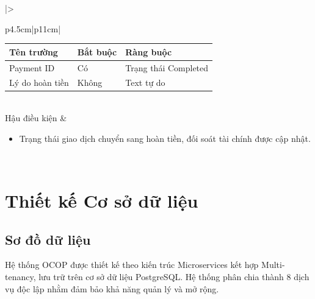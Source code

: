 \documentclass[12pt,a4paper]{report}
\begin{document}
\begin{longtable}{|>{\raggedright\arraybackslash\bfseries}p{4.5cm}|p{11cm}|}
\begin{tabular}{|p{3.5cm}|p{2.5cm}|p{4cm}|}
\hline
\textbf{Tên trường} & \textbf{Bắt buộc} & \textbf{Ràng buộc} \\ \hline
Payment ID & Có & Trạng thái Completed \\ \hline
Lý do hoàn tiền & Không & Text tự do \\ \hline
\end{tabular} \\ \hline
Hậu điều kiện & 
\begin{itemize}[leftmargin=*, nosep, topsep=0pt, partopsep=0pt]
    \item Trạng thái giao dịch chuyển sang hoàn tiền, đối soát tài chính được cập nhật.
\end{itemize} \\ \hline
\end{longtable}

\section{Thiết kế Cơ sở dữ liệu}

\subsection{Sơ đồ dữ liệu}




Hệ thống OCOP được thiết kế theo kiến trúc Microservices kết hợp Multi-tenancy, lưu trữ trên cơ sở dữ liệu PostgreSQL. Hệ thống phân chia thành 8 dịch vụ độc lập nhằm đảm bảo khả năng quản lý và mở rộng.
\end{document}

